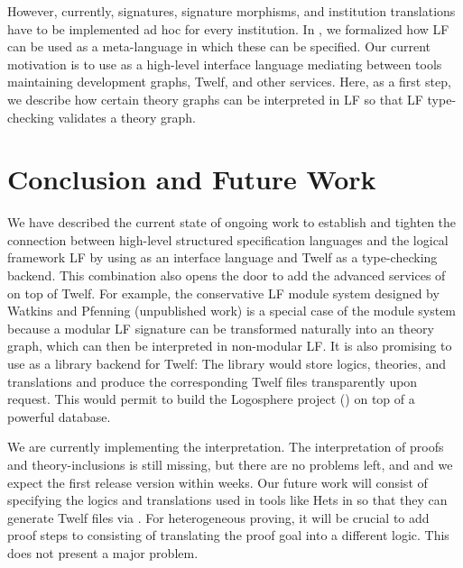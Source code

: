 \documentclass{entcs}
\begin{document}
However, currently, signatures, signature morphisms, and institution translations have to be implemented ad hoc for every institution. In \cite{rabe:instlf:07}, we formalized how LF can be used as a meta-language in which these can be specified. Our current motivation is to use {\omdoc} as a high-level interface language mediating between tools maintaining development graphs, Twelf, and other services. Here, as a first step, we describe how certain {\omdoc} theory graphs can be interpreted in LF so that LF type-checking validates a theory graph.



\section{Conclusion and Future Work}

We have described the current state of ongoing work to establish and tighten the connection between high-level structured specification languages and the logical framework LF by using {\omdoc} as an interface language and Twelf as a type-checking backend. This combination also opens the door to add the advanced services of {\omdoc} on top of Twelf. For example, the conservative LF module system designed by Watkins and Pfenning (unpublished work) is a special case of the {\omdoc} module system because a modular LF signature can be transformed naturally into an {\omdoc} theory graph, which can then be interpreted in non-modular LF. It is also promising to use {\omdoc} as a library backend for Twelf: The library would store logics, theories, and translations and produce the corresponding Twelf files transparently upon request. This would permit to build the Logosphere project (\cite{logosphere}) on top of a powerful database.

We are currently implementing the interpretation. The interpretation of proofs and theory-inclusions is still missing, but there are no problems left, and and we expect the first release version within weeks. Our future work will consist of specifying the logics and translations used in tools like Hets in {\omdoc} so that they can generate Twelf files via {\omdoc}. For heterogeneous proving, it will be crucial to add proof steps to {\omdoc} consisting of translating the proof goal into a different logic. This does not present a major problem.



\end{document}
